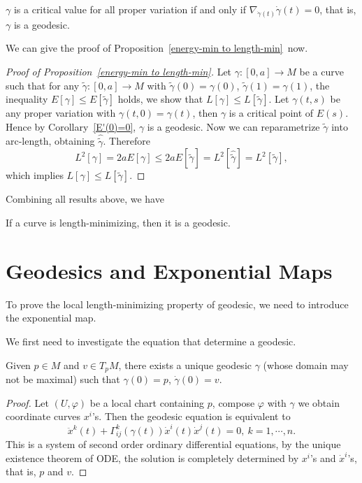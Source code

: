 \begin{cor}\label{E'(0)=0}
    $\gamma$ is a critical value for all proper variation if and only if $\nabla_{\dot\gamma(t)}\dot\gamma(t)=0$, that is, $\gamma$ is a geodesic.
\end{cor}

We can give the proof of Proposition~\ref{energy-min to length-min}~now.
\begin{proof}[Proof of Proposition~\ref{energy-min to length-min}]
    Let $\gamma:[0,a]\to M$ be a curve such that for any $\tilde\gamma:[0,a]\to M$ with $\tilde\gamma(0)=\gamma(0)$, $\tilde\gamma(1)=\gamma(1)$, the inequality $E[\gamma]\leq E[\tilde\gamma]$ holds, we show that $L[\gamma]\leq L[\tilde\gamma]$.
    Let $\gamma(t,s)$ be any proper variation with $\gamma(t,0)=\gamma(t)$, then $\gamma$ is a critical point of $E(s)$.
    Hence by Corollary~\ref{E'(0)=0}, $\gamma$ is a geodesic.
    Now we can reparametrize $\tilde\gamma$ into arc-length, obtaining $\hat{\tilde\gamma}$.
    Therefore
    \[L^2[\gamma]=2aE[\gamma]\leq 2aE\left[\hat{\tilde\gamma}\right]=L^2\left[\hat{\tilde\gamma}\right]=L^2[\tilde\gamma],\]
    which implies $L[\gamma]\leq L[\tilde\gamma]$.
\end{proof}

Combining all results above, we have
\begin{prop}
    If a curve is length-minimizing, then it is a geodesic.
\end{prop}

\section{Geodesics and Exponential Maps}
To prove the local length-minimizing property of geodesic, we need to introduce the exponential map.

We first need to investigate the equation that determine a geodesic.
\begin{prop}
    Given $p\in M$ and $v\in T_pM$, there exists a unique geodesic $\gamma$ (whose domain may not be maximal) such that $\gamma(0)=p$, $\dot\gamma(0)=v$.
\end{prop}
\begin{proof}
    Let $(U,\varphi)$ be a local chart containing $p$, compose $\varphi$ with $\gamma$ we obtain coordinate curves $x^i$'s.
    Then the geodesic equation is equivalent to
    \[\ddot{x}^k(t)+\Gamma^k_{ij}(\gamma(t))\dot{x}^i(t)\dot{x}^j(t)=0,\ k=1,\cdots,n.\]
    This is a system of second order ordinary differential equations, by the unique existence theorem of ODE, the solution is completely determined by $x^i$'s and $\dot{x}^i$'s, that is, $p$ and $v$.
\end{proof}

